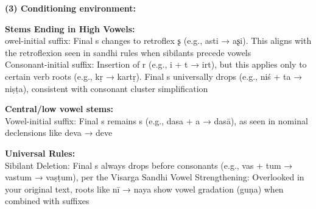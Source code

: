 \documentclass[12pt]{article}
\begin{document}
\bigskip

\noindent \textbf{(3) Conditioning environment:}

\noindent \textbf{Stems Ending in High Vowels:} \\ 
owel-initial suffix: Final s changes to retroflex ʂ (e.g., asti → aʂi). This aligns with the retroflexion seen in sandhi rules when sibilants precede vowels \\
Consonant-initial suffix:
Insertion of r (e.g., i + t → irt), but this applies only to certain verb roots (e.g., kṛ → kartṛ).
Final s universally drops (e.g., niś + ta → niṣṭa), consistent with consonant cluster simplification
\bigskip

\noindent \textbf{Central/low vowel stems:} \\
Vowel-initial suffix: Final s remains s (e.g., dasa + a → dasā), as seen in nominal declensions like deva → deve

\bigskip

\noindent \textbf{Universal Rules:} \\
Sibilant Deletion: Final s always drops before consonants (e.g., vas + tum → vastum → vaṣṭum), per the Visarga Sandhi
Vowel Strengthening: Overlooked in your original text, roots like nī → naya show vowel gradation (guṇa) when combined with suffixes
\end{document}
